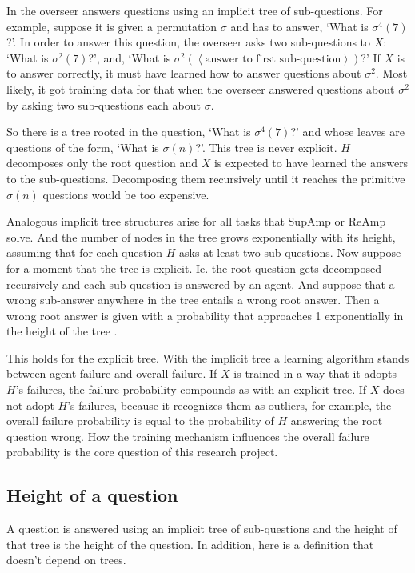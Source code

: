 \documentclass{farlamp}
\begin{document}
In \textcite{CSASupAmp} the overseer answers questions using an implicit tree of
sub-questions. For example, suppose it is given a permutation $\sigma$ and has
to answer, ‘What is $\sigma^4(7)$?’. In order to answer this question, the
overseer asks two sub-questions to $X$: ‘What is $\sigma^2(7)$?’, and, ‘What is
$\sigma^2(\left<\text{answer to first sub-question}\right>)$?’
If $X$ is to answer correctly, it must have learned how to answer questions
about $\sigma^2$. Most likely, it got training data for that when the overseer
answered questions about $\sigma^2$ by asking two sub-questions each about
$\sigma$.

So there is a tree rooted in the question, ‘What is $\sigma^4(7)$?’ and whose
leaves are questions of the form, ‘What is $\sigma(n)$?’. This tree is never
explicit. $H$ decomposes only the root question and $X$ is expected to have
learned the answers to the sub-questions. Decomposing them recursively until it
reaches the primitive $\sigma(n)$ questions would be too expensive.

Analogous implicit tree structures arise for all tasks that SupAmp or ReAmp
solve. And the number of nodes in the tree grows exponentially with its height,
assuming that for each question $H$ asks at least two sub-questions.
Now suppose for a moment that the tree is explicit. Ie. the root question gets
decomposed recursively and each sub-question is answered by an agent. And
suppose that a wrong sub-answer anywhere in the tree entails a wrong root
answer. Then a wrong root answer is given with a probability that approaches 1
exponentially in the height of the tree \parencite{ChriRelAmp}.

This holds for the explicit tree. With the implicit tree a learning algorithm
stands between agent failure and overall failure. If $X$ is trained in a way
that it adopts $H$'s failures, the failure probability compounds as with an
explicit tree. If $X$ does not adopt $H$'s failures, because it recognizes them
as outliers, for example, the overall failure probability is equal to the
probability of $H$ answering the root question wrong.
How the training mechanism influences the overall failure probability is the
core question of this research project.


\subsection{Height of a question}

A question is answered using an implicit tree of sub-questions and the height of
that tree is the height of the question. In addition, here is a definition that
doesn't depend on trees.
\end{document}
